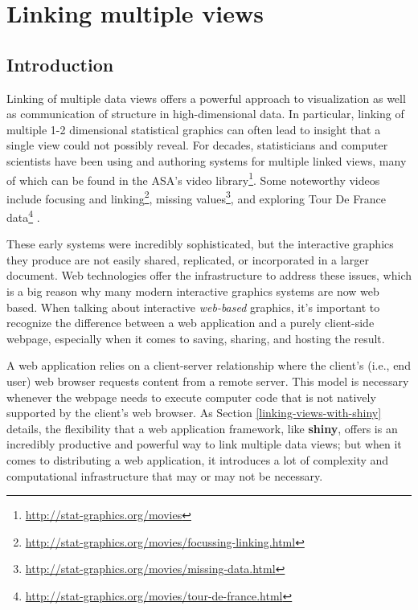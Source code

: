 \documentclass[
  12pt,
]{krantz}
\renewcommand{\href}[2]{#2\footnote{\url{#1}}}
\begin{document}
\hypertarget{part-linking-multiple-views}{%
\part{Linking multiple views}\label{part-linking-multiple-views}}

\hypertarget{introduction-1}{%
\chapter{Introduction}\label{introduction-1}}

Linking of multiple data views offers a powerful approach to visualization as well as communication of structure in high-dimensional data. In particular, linking of multiple 1-2 dimensional statistical graphics can often lead to insight that a single view could not possibly reveal. For decades, statisticians and computer scientists have been using and authoring systems for multiple linked views, many of which can be found in the \href{http://stat-graphics.org/movies}{ASA's video library}. Some noteworthy videos include \href{http://stat-graphics.org/movies/focussing-linking.html}{focusing and linking}, \href{http://stat-graphics.org/movies/missing-data.html}{missing values}, and \href{http://stat-graphics.org/movies/tour-de-france.html}{exploring Tour De France data} \citep{xgobi, mondrianbook}.

These early systems were incredibly sophisticated, but the interactive graphics they produce are not easily shared, replicated, or incorporated in a larger document. Web technologies offer the infrastructure to address these issues, which is a big reason why many modern interactive graphics systems are now web based. When talking about interactive \emph{web-based} graphics, it's important to recognize the difference between a web application and a purely client-side webpage, especially when it comes to saving, sharing, and hosting the result.

A web application relies on a client-server relationship where the client's (i.e., end user) web browser requests content from a remote server. This model is necessary whenever the webpage needs to execute computer code that is not natively supported by the client's web browser. As Section \ref{linking-views-with-shiny} details, the flexibility that a web application framework, like \textbf{shiny}, offers is an incredibly productive and powerful way to link multiple data views; but when it comes to distributing a web application, it introduces a lot of complexity and computational infrastructure that may or may not be necessary.
\end{document}
